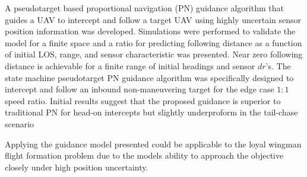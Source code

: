 \documentclass[]{aiaa-tc}%
\begin{document}


A pseudotarget based proportional navigation (PN) guidance algorithm that guides a UAV to intercept and follow a target UAV using highly uncertain sensor position information was developed. Simulations were performed to validate the model for a finite space and a ratio for predicting following distance as a function of initial LOS, range, and sensor characteristic was presented. Near zero following distance is achievable for a finite range of initial headings and sensor $dr$'s. The state machine pseudotarget PN guidance algorithm was specifically designed to intercept and follow an inbound non-maneuvering target for the edge case $1:1$ speed ratio. Initial results suggest that the proposed guidance is superior to traditional PN for head-on intercepts but slightly underproform in the tail-chase scenario 

Applying the guidance model presented could be applicable to the loyal wingman flight formation problem due to the models ability to approach the objective closely under high position uncertainty. 


\end{document}
